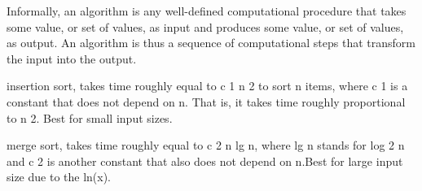 Informally, an algorithm is any well-deﬁned computational procedure that takes some value, or set of values, as input and produces some value, or set of values, as output. An algorithm is thus a sequence of computational steps that transform the
input into the output.

insertion sort, takes time roughly equal to c 1 n 2 to sort n items, where c 1
is a constant that does not depend on n. That is, it takes time roughly proportional
to n 2. Best for small input sizes.

merge sort, takes time roughly equal to c 2 n lg n, where lg n
stands for log 2 n and c 2 is another constant that also does not depend on n.Best for large input size due to the ln(x).
